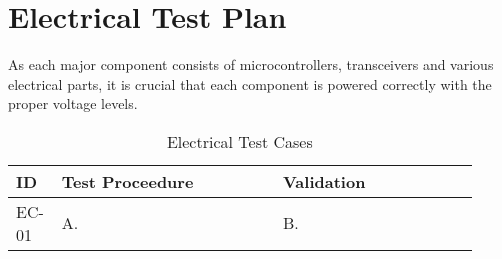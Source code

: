 

\setcounter{section}{3}
\section{Electrical Test Plan}
\bigskip


As each major component consists of microcontrollers, transceivers and various electrical parts, it is crucial that each component is powered correctly with the proper voltage levels.


\bigskip
\bgroup
\def\arraystretch{1.25}
\begin{table}[h!]
    \centering
    \begin{tabular}{|p{0.07\linewidth}|p{0.45\linewidth}|p{0.40\linewidth}|} 
    \hline
    ID & Test Proceedure & Validation\\ 

    \hline
    EC-01
    & A.  
    & B. \\ 
    \hline    





    \hline
    \end{tabular}
    \caption{Electrical Test Cases}
\end{table}